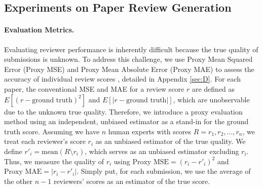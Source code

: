 \documentclass{article} %
\begin{document}

\subsection{Experiments on Paper Review Generation}


\paragraph{Evaluation Metrics.}

Evaluating reviewer performance is inherently difficult because the true quality of submissions is unknown. To address this challenge, we use Proxy Mean Squared Error (Proxy MSE) and Proxy Mean Absolute Error (Proxy MAE) to assess the accuracy of individual review scores \citep{su2024analysisicml2023ranking}, detailed in Appendix \ref{sec:D}. For each paper, the conventional MSE and MAE for a review score $r$ are defined as $E\left[(r - \text{ground truth})^2\right]$ and $E\left[|r - \text{ground truth}|\right]$, which are unobservable due to the unknown true quality. Therefore, we introduce a proxy evaluation method using an independent, unbiased estimator as a stand-in for the ground truth score. Assuming we have $n$ human experts with scores $R = {r_1, r_2, \dots, r_n}$, we treat each reviewer's score $r_i$ as an unbiased estimator of the true quality. We define $r'_i = \text{mean}(R \setminus {r_i})$, which serves as an unbiased estimator excluding $r_i$. Thus, we measure the quality of $r_i$ using $\text{Proxy MSE} = (r_i - r'_i)^2$ and $\text{Proxy MAE} = |r_i - r'_i|$. Simply put, for each submission, we use the average of the other $n-1$ reviewers' scores as an estimator of the true score.


\end{document}
